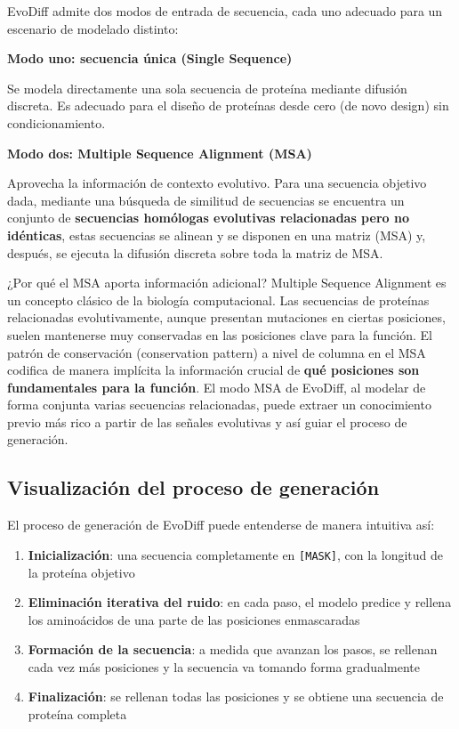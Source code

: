 EvoDiff admite dos modos de entrada de secuencia, cada uno adecuado para un escenario de modelado distinto:

\textbf{Modo uno: secuencia única (Single Sequence)}

Se modela directamente una sola secuencia de proteína mediante difusión discreta. Es adecuado para el diseño de proteínas desde cero (de novo design) sin condicionamiento.

\textbf{Modo dos: Multiple Sequence Alignment (MSA)}

Aprovecha la información de contexto evolutivo. Para una secuencia objetivo dada, mediante una búsqueda de similitud de secuencias se encuentra un conjunto de \textbf{secuencias homólogas evolutivas relacionadas pero no idénticas}, estas secuencias se alinean y se disponen en una matriz (MSA) y, después, se ejecuta la difusión discreta sobre toda la matriz de MSA.

\begin{knowledgebox}{¿Por qué el MSA aporta información adicional?}
Multiple Sequence Alignment es un concepto clásico de la biología computacional. Las secuencias de proteínas relacionadas evolutivamente, aunque presentan mutaciones en ciertas posiciones, suelen mantenerse muy conservadas en las posiciones clave para la función. El patrón de conservación (conservation pattern) a nivel de columna en el MSA codifica de manera implícita la información crucial de \textbf{qué posiciones son fundamentales para la función}. El modo MSA de EvoDiff, al modelar de forma conjunta varias secuencias relacionadas, puede extraer un conocimiento previo más rico a partir de las señales evolutivas y así guiar el proceso de generación.
\end{knowledgebox}

\subsection{Visualización del proceso de generación}

El proceso de generación de EvoDiff puede entenderse de manera intuitiva así:

\begin{enumerate}
    \item \textbf{Inicialización}: una secuencia completamente en \texttt{[MASK]}, con la longitud de la proteína objetivo
    \item \textbf{Eliminación iterativa del ruido}: en cada paso, el modelo predice y rellena los aminoácidos de una parte de las posiciones enmascaradas
    \item \textbf{Formación de la secuencia}: a medida que avanzan los pasos, se rellenan cada vez más posiciones y la secuencia va tomando forma gradualmente
    \item \textbf{Finalización}: se rellenan todas las posiciones y se obtiene una secuencia de proteína completa
\end{enumerate}

